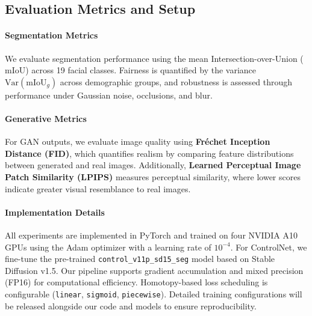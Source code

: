 \subsection{Evaluation Metrics and Setup}
\label{subsec:evaluation}

\paragraph{Segmentation Metrics}  
We evaluate segmentation performance using the mean Intersection-over-Union (\(\mathrm{mIoU}\)) across 19 facial classes. Fairness is quantified by the variance \(\mathrm{Var}(\mathrm{mIoU}_g)\) across demographic groups, and robustness is assessed through performance under Gaussian noise, occlusions, and blur.

\paragraph{Generative Metrics}  
For GAN outputs, we evaluate image quality using \textbf{Fréchet Inception Distance (FID)}, which quantifies realism by comparing feature distributions between generated and real images. Additionally, \textbf{Learned Perceptual Image Patch Similarity (LPIPS)} measures perceptual similarity, where lower scores indicate greater visual resemblance to real images.

\paragraph{Implementation Details}  
All experiments are implemented in PyTorch and trained on four NVIDIA A10 GPUs using the Adam optimizer with a learning rate of \(10^{-4}\). For ControlNet, we fine-tune the pre-trained \texttt{control\_v11p\_sd15\_seg} model based on Stable Diffusion v1.5. Our pipeline supports gradient accumulation and mixed precision (FP16) for computational efficiency. Homotopy-based loss scheduling is configurable (\texttt{linear}, \texttt{sigmoid}, \texttt{piecewise}). Detailed training configurations will be released alongside our code and models to ensure reproducibility.


